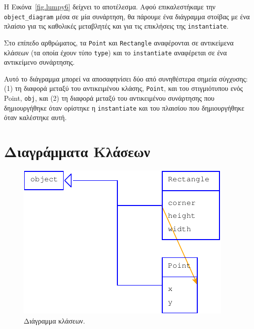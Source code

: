 \documentclass[10pt]{book}
\begin{document}
Η Εικόνα~\ref{fig.lumpy6} δείχνει το αποτέλεσμα.  Αφού επικαλεστήκαμε την \verb"object_diagram" μέσα σε μία
συνάρτηση, θα πάρουμε ένα διάγραμμα στοίβας με ένα πλαίσιο για τις καθολικές μεταβλητές και για τις επικλήσεις
της {\tt instantiate}.

Στο επίπεδο αρθρώματος, τα {\tt Point} και {\tt Rectangle} αναφέρονται σε αντικείμενα κλάσεων (τα οποία έχουν
τύπο {\tt type}) και το {\tt instantiate} αναφέρεται σε ένα αντικείμενο συνάρτησης.

Αυτό το διάγραμμα μπορεί να αποσαφηνίσει δύο από συνηθέστερα σημεία σύγχυσης: (1) τη διαφορά μεταξύ του
αντικειμένου κλάσης, {\tt Point}, και του στιγμιότυπου ενός Point, {\tt obj}, και (2) τη διαφορά μεταξύ
του αντικειμένου συνάρτησης που δημιουργήθηκε όταν ορίστηκε η {\tt instantiate} και του πλαισίου που
δημιουργήθηκε όταν καλέστηκε αυτή.



\section{Διαγράμματα Κλάσεων}

\begin{figure}
\centerline
{\includegraphics[scale=0.7]{figs/lumpydemo7.pdf}}
\caption{Διάγραμμα κλάσεων.}
\label{fig.lumpy7}
\end{figure}
\end{document}
